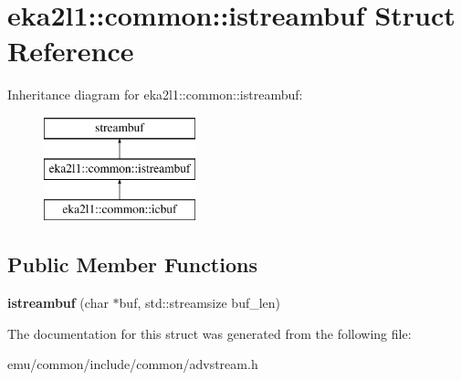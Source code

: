 \hypertarget{structeka2l1_1_1common_1_1istreambuf}{}\section{eka2l1\+:\+:common\+:\+:istreambuf Struct Reference}
\label{structeka2l1_1_1common_1_1istreambuf}
Inheritance diagram for eka2l1\+:\+:common\+:\+:istreambuf\+:\begin{figure}[H]
\begin{center}
\leavevmode
\includegraphics[height=3.000000cm]{structeka2l1_1_1common_1_1istreambuf}
\end{center}
\end{figure}
\subsection*{Public Member Functions}
\begin{DoxyCompactItemize}
\item 
\mbox{\label{structeka2l1_1_1common_1_1istreambuf_a8bc1a53e4682bf3969206cab0811925c}} 
{\bfseries istreambuf} (char $\ast$buf, std\+::streamsize buf\+\_\+len)
\end{DoxyCompactItemize}


The documentation for this struct was generated from the following file\+:\begin{DoxyCompactItemize}
\item 
emu/common/include/common/advstream.\+h\end{DoxyCompactItemize}
